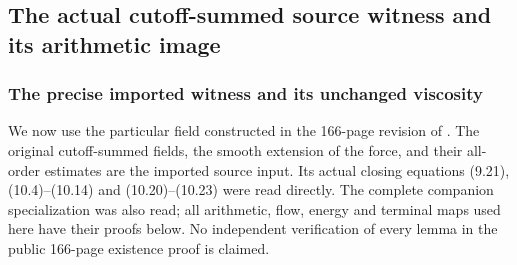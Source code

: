 \subsection{The actual cutoff-summed source witness and its arithmetic image}
\label{sec:cq-NS-actual-witness}

\subsubsection{The precise imported witness and its unchanged viscosity}

We now use the particular field constructed in the
166-page revision of \cite{cqNS2026}. The original
cutoff-summed fields, the smooth extension of the force,
and their all-order estimates are the imported source input.
Its actual closing equations (9.21), (10.4)--(10.14) and
(10.20)--(10.23) were read directly. The complete companion
specialization \cite{cqNSWitness} was also read; all arithmetic,
flow, energy and terminal maps used here have their proofs below.
No independent verification of every lemma in the public
166-page existence proof is claimed.

